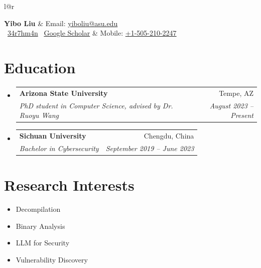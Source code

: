 \documentclass[letterpaper,11pt]{article}
\makeatletter
\newcommand{\resumeItem}[1]{
  \item\small{
    {#1 \vspace{-2pt}}
  }
}
\newcommand{\resumeSubheading}[4]{
  \vspace{-1pt}\item
    \begin{tabular*}{0.97\textwidth}[t]{l@{\extracolsep{\fill}}r}
      \textbf{#1} & #2 \\
      \textit{\small#3} & \textit{\small #4} \\
    \end{tabular*}\vspace{-5pt}
}
\newcommand{\resumeSubHeadingListStart}{\begin{itemize}[leftmargin=*]}
\newcommand{\resumeSubHeadingListEnd}{\end{itemize}}
\makeatother
\begin{document}
\begin{tabular*}{\textwidth}{l@{\extracolsep{\fill}}r}

  {\Large \textbf{Yibo Liu}}
  & Email: \href{mailto:yiboliu@asu.edu}{yiboliu@asu.edu} \\

  \small
  \faGithub\ \href{https://github.com/bluesadi}{34r7hm4n}
  \quad
  \faGraduationCap\ \href{https://scholar.google.com/citations?user=Ckof_x4AAAAJ&hl=en}{Google Scholar}
  & \small Mobile: \href{tel:+15052102247}{+1-505-210-2247} \\

\end{tabular*}


\section{Education}
  \resumeSubHeadingListStart
    \resumeSubheading
      {Arizona State University}{Tempe, AZ}
      {PhD student in Computer Science, advised by Dr. Ruoyu Wang}{August 2023 -- Present}
    \resumeSubheading
      {Sichuan University}{Chengdu, China}
      {Bachelor in Cybersecurity}{September 2019 -- June 2023}
  \resumeSubHeadingListEnd

\section{Research Interests}
 \resumeSubHeadingListStart
   \resumeItem{Decompilation\vspace{-4pt}}
   \resumeItem{Binary Analysis\vspace{-4pt}}
   \resumeItem{LLM for Security\vspace{-4pt}}
   \resumeItem{Vulnerability Discovery\vspace{-4pt}}
 \resumeSubHeadingListEnd

\end{document}
